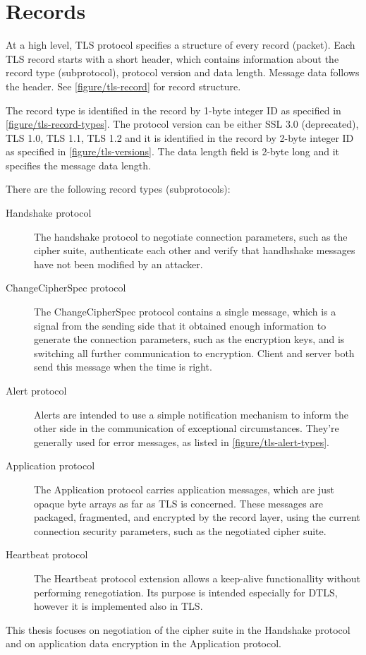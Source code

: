 \section{Records}



At a high level, TLS protocol specifies a structure of every record (packet). Each TLS record starts with a short header, which contains information about the record type (subprotocol), protocol version and data length. Message data follows the header. See \autoref{figure/tls-record} for record structure.

The record type is identified in the record by 1-byte integer ID as specified in \autoref{figure/tls-record-types}. The protocol version can be either SSL 3.0 (deprecated), TLS 1.0, TLS 1.1, TLS 1.2 and it is identified in the record by 2-byte integer ID as specified in \autoref{figure/tls-versions}. The data length field is 2-byte long and it specifies the message data length.

There are the following record types (subprotocols):

\begin{description}
  \item[Handshake protocol] The handshake protocol to negotiate connection parameters, such as the cipher suite, authenticate each other and verify that handhshake messages have not been modified by an attacker.
  \item[ChangeCipherSpec protocol] The ChangeCipherSpec protocol contains a single message, which is a signal from the sending side that it obtained enough information to generate the connection parameters, such as the encryption keys, and is switching all further communication to encryption. Client and server both send this message when the time is right.
  \item[Alert protocol] Alerts are intended to use a simple notification mechanism to inform the other side in the communication of exceptional circumstances. They're generally used for error messages, as listed in \autoref{figure/tls-alert-types}.
  \item[Application protocol] The Application protocol carries application messages, which are just opaque byte arrays as far as TLS is concerned. These messages are packaged, fragmented, and encrypted by the record layer, using the current connection security parameters, such as the negotiated cipher suite.
  \item[Heartbeat protocol] The Heartbeat protocol extension allows a keep-alive functionallity without performing renegotiation. Its purpose is intended especially for DTLS, however it is implemented also in TLS.
\end{description}

This thesis focuses on negotiation of the cipher suite in the Handshake protocol and on application data encryption in the Application protocol.
